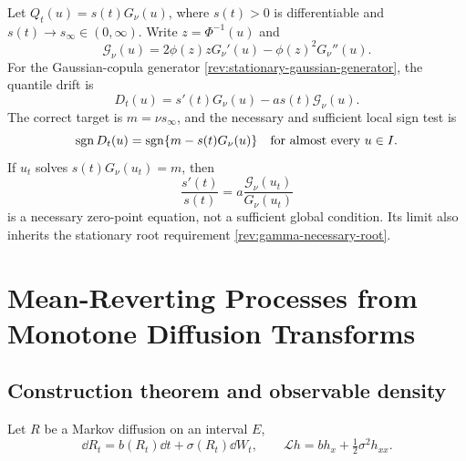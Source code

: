 \begin{example}
\label{rev:ex-gamma-timevarying}
Let $Q_t(u)=s(t)G_\nu(u)$, where $s(t)>0$ is differentiable and
$s(t)\to s_\infty\in(0,\infty)$.  Write $z=\Phi^{-1}(u)$ and
\begin{equation}
\mathscr G_\nu(u)=2\phi(z)zG_\nu'(u)-\phi(z)^2G_\nu''(u).
\label{rev:gamma-G}
\end{equation}
For the Gaussian-copula generator \eqref{rev:stationary-gaussian-generator},
the quantile drift is
\begin{equation}
D_t(u)=s'(t)G_\nu(u)-a s(t)\mathscr G_\nu(u).
\label{rev:gamma-time-drift}
\end{equation}
The correct target is $m=\nu s_\infty$, and the necessary and sufficient local
sign test is
\begin{equation}
\operatorname{sgn} D_t(u)=\operatorname{sgn}\{m-s(t)G_\nu(u)\}
\quad\text{for almost every }u\in I.
\label{rev:gamma-time-full-sign}
\end{equation}
If $u_t$ solves $s(t)G_\nu(u_t)=m$, then
\begin{equation}
\frac{s'(t)}{s(t)}
=a\frac{\mathscr G_\nu(u_t)}{G_\nu(u_t)}
\label{rev:gamma-time-necessary-ode}
\end{equation}
is a necessary zero-point equation, not a sufficient global condition.  Its
limit also inherits the stationary root requirement
\eqref{rev:gamma-necessary-root}.
\end{example}

\section{Mean-Reverting Processes from Monotone Diffusion Transforms}

\subsection{Construction theorem and observable density}

Let $R$ be a Markov diffusion on an interval $E$,
\begin{equation}
\dd R_t=b(R_t)\dd t+\sigma(R_t)\dd W_t,
\qquad
\mathcal Lh=b h_x+\tfrac12\sigma^2 h_{xx}.
\label{rev:base-diffusion}
\end{equation}

